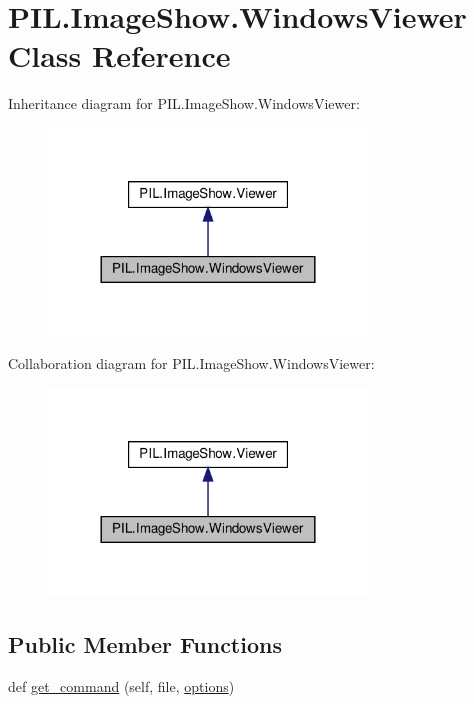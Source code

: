 \hypertarget{classPIL_1_1ImageShow_1_1WindowsViewer}{}\section{P\+I\+L.\+Image\+Show.\+Windows\+Viewer Class Reference}
\label{classPIL_1_1ImageShow_1_1WindowsViewer}


Inheritance diagram for P\+I\+L.\+Image\+Show.\+Windows\+Viewer\+:
\nopagebreak
\begin{figure}[H]
\begin{center}
\leavevmode
\includegraphics[width=240pt]{classPIL_1_1ImageShow_1_1WindowsViewer__inherit__graph}
\end{center}
\end{figure}


Collaboration diagram for P\+I\+L.\+Image\+Show.\+Windows\+Viewer\+:
\nopagebreak
\begin{figure}[H]
\begin{center}
\leavevmode
\includegraphics[width=240pt]{classPIL_1_1ImageShow_1_1WindowsViewer__coll__graph}
\end{center}
\end{figure}
\subsection*{Public Member Functions}
\begin{DoxyCompactItemize}
\item 
def \hyperlink{classPIL_1_1ImageShow_1_1WindowsViewer_a9fc5b7fc61ba8b2e2348b64827dacde8}{get\+\_\+command} (self, file, \hyperlink{classPIL_1_1ImageShow_1_1WindowsViewer_affe3b08113fb968b6effd1272b5c8bd9}{options})
\end{DoxyCompactItemize}
